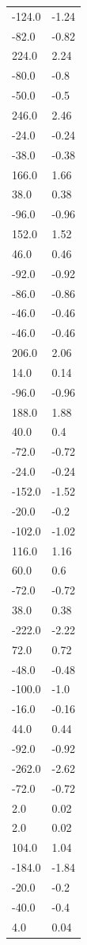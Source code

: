 \begin{longtable}{ll}
-124.0 & -1.24 \\
-82.0 & -0.82 \\
224.0 & 2.24 \\
-80.0 & -0.8 \\
-50.0 & -0.5 \\
246.0 & 2.46 \\
-24.0 & -0.24 \\
-38.0 & -0.38 \\
166.0 & 1.66 \\
38.0 & 0.38 \\
-96.0 & -0.96 \\
152.0 & 1.52 \\
46.0 & 0.46 \\
-92.0 & -0.92 \\
-86.0 & -0.86 \\
-46.0 & -0.46 \\
-46.0 & -0.46 \\
206.0 & 2.06 \\
14.0 & 0.14 \\
-96.0 & -0.96 \\
188.0 & 1.88 \\
40.0 & 0.4 \\
-72.0 & -0.72 \\
-24.0 & -0.24 \\
-152.0 & -1.52 \\
-20.0 & -0.2 \\
-102.0 & -1.02 \\
116.0 & 1.16 \\
60.0 & 0.6 \\
-72.0 & -0.72 \\
38.0 & 0.38 \\
-222.0 & -2.22 \\
72.0 & 0.72 \\
-48.0 & -0.48 \\
-100.0 & -1.0 \\
-16.0 & -0.16 \\
44.0 & 0.44 \\
-92.0 & -0.92 \\
-262.0 & -2.62 \\
-72.0 & -0.72 \\
2.0 & 0.02 \\
2.0 & 0.02 \\
104.0 & 1.04 \\
-184.0 & -1.84 \\
-20.0 & -0.2 \\
-40.0 & -0.4 \\
4.0 & 0.04 \\

\end{longtable}
